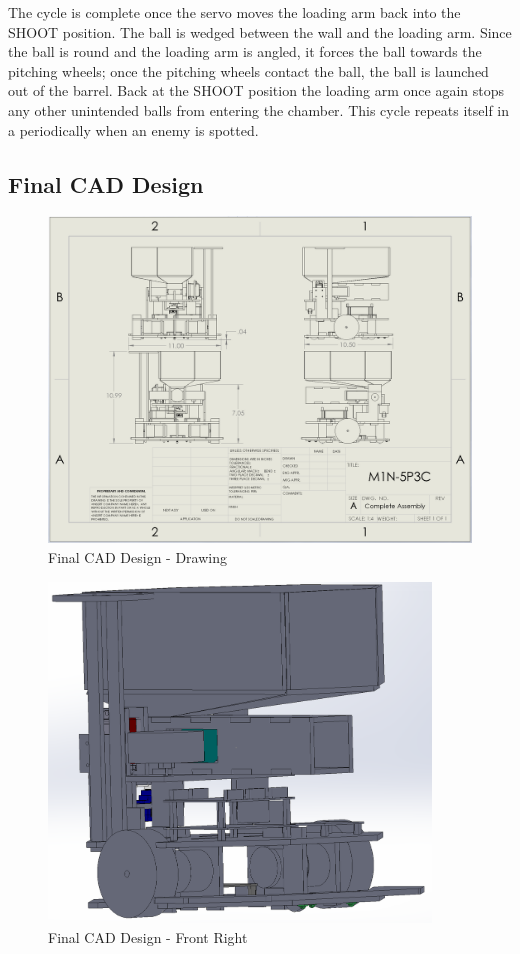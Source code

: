 \documentclass{article}
\begin{document}
The cycle is complete once the servo moves the loading arm back into the SHOOT position. The ball is wedged between the wall and the loading arm. Since the ball is round and the loading arm is angled, it forces the ball towards the pitching wheels; once the pitching wheels contact the ball, the ball is launched out of the barrel. Back at the SHOOT position the loading arm once again stops any other unintended balls from entering the chamber. This cycle repeats itself in a periodically when an enemy is spotted.

\subsection{Final CAD Design}

\begin{figure}[H]
    \centering
    \includegraphics[width = 6in]{M1N-5P3CDrawing.PNG}
    \caption{Final CAD Design - Drawing}
    \label{fig:M1N-5P3CDrawing}
\end{figure}

\begin{figure}[H]
    \centering
    \includegraphics[width = 4in]{FinalCad1.PNG}
    \caption{Final CAD Design - Front Right}
    \label{fig:FinalCad1}
\end{figure}
\end{document}
